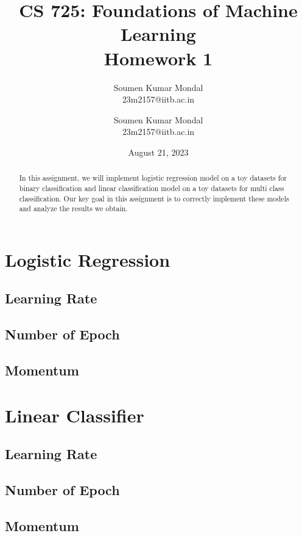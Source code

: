 \documentclass[12pt, a4paper, twoside]{article}
\title{\vspace{-0.5in}\textbf{CS 725: Foundations of Machine Learning \\
Homework 1}}
\author{Soumen Kumar Mondal\\
23m2157@iitb.ac.in 
\and
Soumen Kumar Mondal \\
23m2157@iitb.ac.in}
\date{August  21, 2023}
\begin{document}
	\maketitle
	\thispagestyle{fancy}
	\begin{abstract}
		In this assignment, we will implement logistic regression model on a toy datasets for binary classification and linear classification model on a toy datasets for multi class classification. Our key goal in this assignment is to correctly implement these models and analyze the results we obtain.
	\end{abstract}
		
		\section{Logistic Regression}\label{S:LR}
			\subsection{Learning Rate}\label{SS:lr-rate}
		\lipsum[1]
			\subsection{Number of Epoch}\label{SS:lr-ep}
		\lipsum[2]
			\subsection{Momentum}\label{SS:lr-mom}
		\lipsum[3]
		
		\section{Linear Classifier}\label{S:LC}
			\subsection{Learning Rate}\label{SS:lc-rate}
		\lipsum[4]
			\subsection{Number of Epoch}\label{SS:lc-ep}
		\lipsum[5]
			\subsection{Momentum}\label{SS:lc-mom}
		\lipsum[6]
\end{document}
